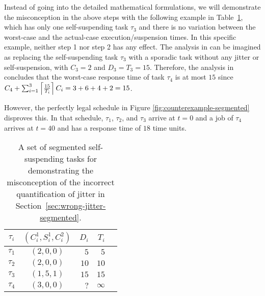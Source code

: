 Instead of going into the detailed mathematical formulations, we will demonstrate the misconception  in the above steps with the following example in Table~\ref{tab:counterexample-segmented}, which has only one self-suspending task $\tau_3$ and there is no variation between the worst-case and the actual-case execution/suspension times.
In
this specific example,  neither step 1 nor step 2 has any effect. The
analysis in \cite{RTCSA-BletsasA05} can be imagined as replacing the
self-suspending task $\tau_3$ with a sporadic task without any jitter or self-suspension, with $C_3=2$ and $D_3=T_3=15$. Therefore, the analysis in \cite{RTCSA-BletsasA05}  concludes that the worst-case response time of task $\tau_4$ is at most $15$ since $C_4+\sum_{i=1}^{3}\left\lceil{\frac{15}{T_i}}\right\rceil C_i = 3+ 6 + 4 + 2= 15$.


However, the perfectly legal schedule in Figure \ref{fig:counterexample-segmented} disproves this.
In that schedule, $\tau_1$, $\tau_2$, and $\tau_3$ arrive at $t=0$ and a job of $\tau_4$ arrives at $t=40$ and has a response time of 
$18$ time units.

\begin{table}[t]
\begin{center}
\begin{tabular}{|c||c|r|r|r|}
\hline
$\tau_i$ & $(C_i^1, S_i^1, C_i^2)$   &   $D_i$  &     $T_i$     \\ \hline
$\tau_1$ &  $(2, 0, 0)$                    &     $5$  &       $5$     \\ \hline
$\tau_2$ &  $(2, 0, 0)$                    &    $10$  &      $10$     \\ \hline
$\tau_3$ &  $(1, 5, 1)$            &    $15$  &      $15$     \\ \hline
$\tau_4$ &  $(3, 0, 0)$                   &    $?$  &   $\infty$    \\ \hline     
\end{tabular}
\end{center}
\caption{A set of segmented self-suspending tasks for demonstrating the misconception of the incorrect quantification of jitter in Section~\ref{sec:wrong-jitter-segmented}.}
\label{tab:counterexample-segmented}
\end{table}

